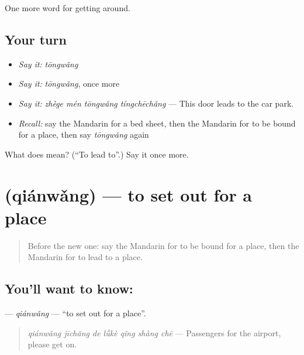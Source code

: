 \begin{grammarlens}[title={What you've built}]
One more word for getting around.
\end{grammarlens}

\subsection*{Your turn}
\begin{itemize}
\raggedright
  \item \emph{Say it:} \emph{tōngwǎng}
  \item \emph{Say it:} \emph{tōngwǎng}, once more
  \item \emph{Say it:} \emph{zhège mén tōngwǎng tíngchēchǎng} — This door leads to the car park.
  \item \emph{Recall:} say the Mandarin for a bed sheet, then the Mandarin for to be bound for a place, then say \emph{tōngwǎng} again
\end{itemize}

\begin{tcolorbox}[breakable,colback=teal!4,colframe=teal!35!black,title={Before you move on}]
What does  mean? (\textquotedblleft{}To lead to\textquotedblright{}.) Say it once more.
\end{tcolorbox}
\section[\texorpdfstring{\zh{前往} (qiánwǎng)}{前往 (qiánwǎng)}]{ (qiánwǎng) — to set out for a place}

\label{lesson:ZH-C428-qianwang}



\begin{quote}
Before the new one: say the Mandarin for to be bound for a place, then the Mandarin for to lead to a place.
\end{quote}

\subsection*{You'll want to know: }
\textbf{} — \emph{qiánwǎng} — \textquotedblleft{}to set out for a place\textquotedblright{}.

\begin{quote}
\textbf{} \emph{qiánwǎng jīchǎng de lǚkè qǐng shàng chē} — Passengers for the airport, please get on.
\end{quote}

